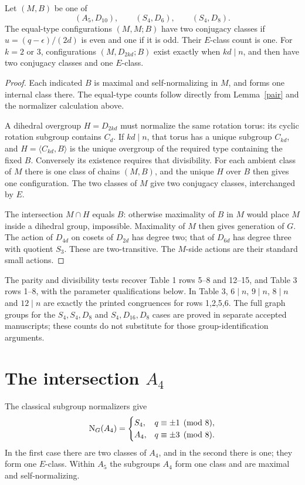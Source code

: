 \documentclass[11pt]{article}
\begin{document}
\begin{theorem}\label{dihedral}
Let $(M,B)$ be one of
\[ (A_5,D_{10}),\qquad (S_4,D_6),\qquad(S_4,D_8). \]
The equal-type configurations $(M,M;B)$ have two conjugacy classes
if $u=(q-\epsilon)/(2d)$ is even and one if it is odd. Their
$E$-class count is one. For $k=2$ or $3$, configurations
$(M,D_{2kd};B)$ exist exactly when $kd\mid n$, and then have
two conjugacy classes and one $E$-class.
\end{theorem}
\begin{proof}
Each indicated $B$ is maximal and self-normalizing in $M$, and
forms one internal class there. The equal-type counts follow directly
from Lemma~\ref{pair} and the normalizer calculation above.

A dihedral overgroup $H=D_{2kd}$ must normalize the same rotation
torus: its cyclic rotation subgroup contains $C_d$. If $kd\mid n$,
that torus has a unique subgroup $C_{kd}$, and
$H=\langle C_{kd},B\rangle$ is the unique overgroup of the
required type containing the fixed $B$. Conversely its existence
requires that divisibility. For each ambient class of $M$ there
is one class of chains $(M,B)$, and the unique $H$ over $B$
then gives one configuration. The two classes of $M$ give two
conjugacy classes, interchanged by $E$.

The intersection $M\cap H$ equals $B$: otherwise maximality
of $B$ in $M$ would place $M$ inside a dihedral group, impossible.
Maximality of $M$ then gives generation of $G$. The action of
$D_{4d}$ on cosets of $D_{2d}$ has degree two; that of $D_{6d}$
has degree three with quotient $S_3$. These are two-transitive.
The $M$-side actions are their standard small actions.
\end{proof}

The parity and divisibility tests recover Table 1 rows 5--8 and
12--15, and Table 3 rows 1--8, with the parameter qualifications
below. In Table 3, $6\mid n$, $9\mid n$, $8\mid n$ and
$12\mid n$ are exactly the printed congruences for rows 1,2,5,6.
The full graph groups for the $S_4,S_4,D_8$ and $S_4,D_{16},D_8$
cases are proved in separate accepted manuscripts; these counts do
not substitute for those group-identification arguments.

\section{The intersection $A_4$}
The classical subgroup normalizers give
\[
 \operatorname{N}_G(A_4)=
 \begin{cases}S_4,&q\equiv\pm1\pmod8,\\
 A_4,&q\equiv\pm3\pmod8.
 \end{cases}
\]
In the first case there are two classes of $A_4$, and in the second
there is one; they form one $E$-class. Within $A_5$ the subgroups
$A_4$ form one class and are maximal and self-normalizing.
\end{document}
